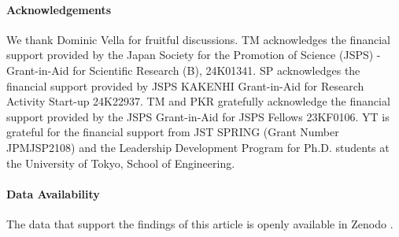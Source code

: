 \documentclass[twocolumn, prl,
 amsmath,amssymb,
 superscriptaddress,aps,
]{revtex4-2}
\begin{document}
\begin{acknowledgments}
\paragraph*{Acknowledgements}
We thank Dominic Vella for fruitful discussions.
TM acknowledges the financial support provided by the Japan Society for the Promotion of Science (JSPS) - Grant-in-Aid for Scientific Research (B), 24K01341. SP acknowledges the financial support provided by JSPS KAKENHI Grant-in-Aid for Research Activity Start-up 24K22937. TM and PKR gratefully acknowledge the financial support provided by the JSPS Grant-in-Aid for JSPS Fellows 23KF0106. YT is grateful for the financial support from JST SPRING (Grant Number JPMJSP2108) and the Leadership Development Program for Ph.D. students at the University of Tokyo, School of Engineering.
\end{acknowledgments}

\paragraph*{Data Availability}
The data that support the findings of this article is openly available in Zenodo
\cite{dataset}.
\end{document}
